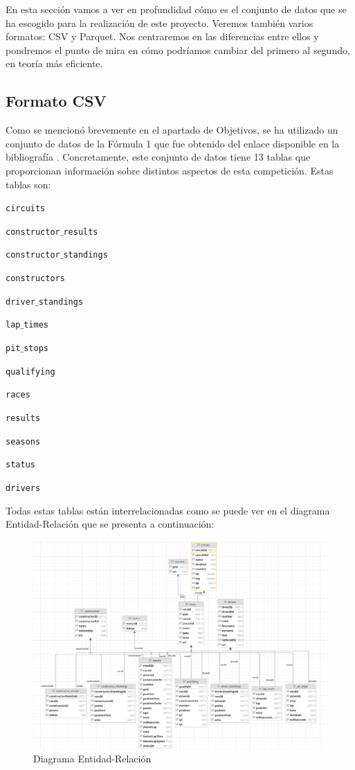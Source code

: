 \documentclass[12pt,twoside,titlepage]{report}
\begin{document}
En esta sección vamos a ver en profundidad cómo es el conjunto de datos que se ha escogido para la realización de este proyecto. Veremos también varios formatos: CSV y Parquet. Nos centraremos en las diferencias entre ellos y pondremos el punto de mira en cómo podríamos cambiar del primero al segundo, en teoría más eficiente.

\subsection{Formato CSV}

Como se mencionó brevemente en el apartado de Objetivos, se ha utilizado un conjunto de datos de la Fórmula 1 que fue obtenido del enlace disponible en la bibliografía \cite{datasource}. Concretamente, este conjunto de datos tiene 13 tablas que proporcionan información sobre distintos aspectos de esta competición. Estas tablas son:

\begin{compactitem}
  \item \texttt{circuits}
  \item \texttt{constructor$\_$results}
  \item \texttt{constructor$\_$standings}
  \item \texttt{constructors}
  \item \texttt{driver$\_$standings}
  \item \texttt{lap$\_$times}
  \item \texttt{pit$\_$stops}
  \item \texttt{qualifying}
  \item \texttt{races}
  \item \texttt{results}
  \item \texttt{seasons}
  \item \texttt{status}
  \item \texttt{drivers}
\end{compactitem}

Todas estas tablas están interrelacionadas como se puede ver en el diagrama Entidad-Relación que se presenta a continuación:

\begin{figure}[H]
  \includegraphics[scale=0.4]{dataset_visualization.png}
  \centering
  \caption{Diagrama Entidad-Relación}
  \label{fig:datavisualization}
  \centering
\end{figure}
\end{document}
